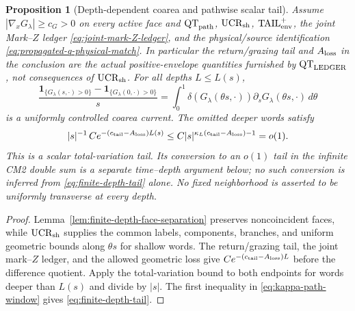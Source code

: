 \documentclass[11pt]{article}
\newtheorem{proposition}[theorem]{Proposition}
\newcommand{\one}{\mathbf 1}
\begin{document}
\begin{proposition}[Depth-dependent coarea and pathwise scalar tail]
\label{prop:parameter-state-master-refinement}
Assume $|\nabla_xG_\lambda|\ge c_G>0$ on every active face and
$\mathrm{QT}_{\rm path}$, $\mathrm{UCR}_{\rm sh}$,
$\mathrm{TAIL}_{\rm env}^{+}$, the joint Mark--$Z$ ledger
\eqref{eq:joint-mark-Z-ledger}, and the physical/source identification
\eqref{eq:propagated-q-physical-match}.  In particular the return/grazing
tail and $A_{\rm loss}$ in the conclusion are the actual positive-envelope
quantities furnished by $\mathrm{QT}_{\rm LEDGER}$, not consequences of
$\mathrm{UCR}_{\rm sh}$.  For all depths
$L\le L(s)$,
\begin{equation}
\label{eq:master-coarea-difference}
 \frac{\one_{\{G_\lambda(s,\cdot)>0\}}
             -\one_{\{G_\lambda(0,\cdot)>0\}}}{s}
 =\int_0^1\delta(G_\lambda(\theta s,\cdot))
   \partial_sG_\lambda(\theta s,\cdot)\,d\theta
\end{equation}
is a uniformly controlled coarea current.  The omitted deeper words satisfy
\begin{equation}
\label{eq:finite-depth-tail}
 |s|^{-1}\,Ce^{-(c_{\rm tail}-A_{\rm loss})L(s)}
 \le C|s|^{\kappa_L(c_{\rm tail}-A_{\rm loss})-1}=o(1).
\end{equation}
This is a scalar total-variation tail.  Its conversion to an $o(1)$ tail in
the infinite CM2 double sum is a separate time--depth argument below; no such
conversion is inferred from \eqref{eq:finite-depth-tail} alone.  No fixed
neighborhood is asserted to be uniformly transverse at every depth.
\end{proposition}

\begin{proof}
Lemma~\ref{lem:finite-depth-face-separation} preserves noncoincident faces,
while $\mathrm{UCR}_{\rm sh}$ supplies the common labels, components, branches, and
uniform geometric bounds along $\theta s$ for shallow words.  The return/grazing tail,
the joint mark--$Z$ ledger, and the allowed geometric loss give
$Ce^{-(c_{\rm tail}-A_{\rm loss})L}$ before the difference quotient.  Apply
the total-variation bound to both endpoints for words deeper than $L(s)$ and
divide by $|s|$.  The first inequality in
\eqref{eq:kappa-path-window} gives \eqref{eq:finite-depth-tail}.
\end{proof}
\end{document}
